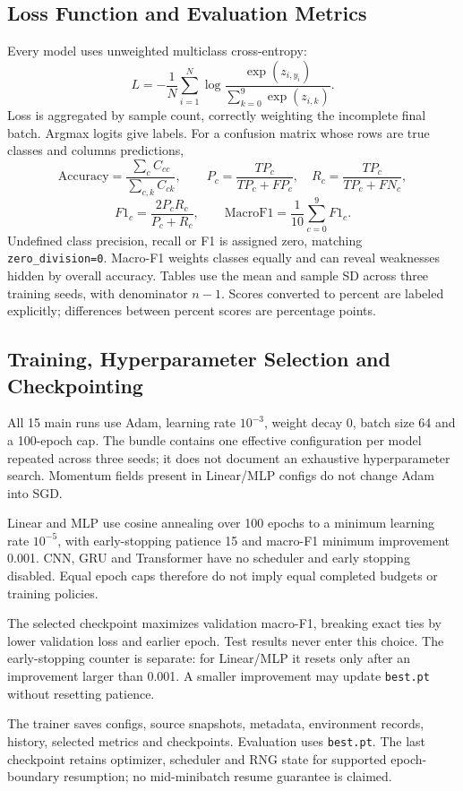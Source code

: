 \subsection{Loss Function and Evaluation Metrics}
Every model uses unweighted multiclass cross-entropy:
\[
 L=-\frac{1}{N}\sum_{i=1}^{N}
 \log\frac{\exp(z_{i,y_i})}{\sum_{k=0}^{9}\exp(z_{i,k})}.
\]
Loss is aggregated by sample count, correctly weighting the incomplete final
batch. Argmax logits give labels. For a confusion matrix whose rows are true
classes and columns predictions,
\[
 \mathrm{Accuracy}=\frac{\sum_c C_{cc}}{\sum_{c,k}C_{ck}},\qquad
 P_c=\frac{TP_c}{TP_c+FP_c},\quad R_c=\frac{TP_c}{TP_c+FN_c},
\]
\[
 F1_c=\frac{2P_cR_c}{P_c+R_c},\qquad
 \mathrm{MacroF1}=\frac{1}{10}\sum_{c=0}^{9}F1_c.
\]
Undefined class precision, recall or F1 is assigned zero, matching
\texttt{zero\_division=0}. Macro-F1 weights classes equally and can reveal
weaknesses hidden by overall accuracy. Tables use the mean and sample SD across
three training seeds, with denominator \(n-1\). Scores converted to percent are
labeled explicitly; differences between percent scores are percentage points.

\subsection{Training, Hyperparameter Selection and Checkpointing}
\label{sec:training}
All 15 main runs use Adam, learning rate \(10^{-3}\), weight decay 0, batch size
64 and a 100-epoch cap. The bundle contains one effective configuration per model
repeated across three seeds; it does not document an exhaustive hyperparameter
search. Momentum fields present in Linear/MLP configs do not change Adam into SGD.

Linear and MLP use cosine annealing over 100 epochs to a minimum learning rate
\(10^{-5}\), with early-stopping patience 15 and macro-F1 minimum improvement
0.001. CNN, GRU and Transformer have no scheduler and early stopping disabled.
Equal epoch caps therefore do not imply equal completed budgets or training policies.

The selected checkpoint maximizes validation macro-F1, breaking exact ties by
lower validation loss and earlier epoch. Test results never enter this choice.
The early-stopping counter is separate: for Linear/MLP it resets only after an
improvement larger than 0.001. A smaller improvement may update \texttt{best.pt}
without resetting patience.

The trainer saves configs, source snapshots, metadata, environment records,
history, selected metrics and checkpoints. Evaluation uses \texttt{best.pt}.
The last checkpoint retains optimizer, scheduler and RNG state for supported
epoch-boundary resumption; no mid-minibatch resume guarantee is claimed.

